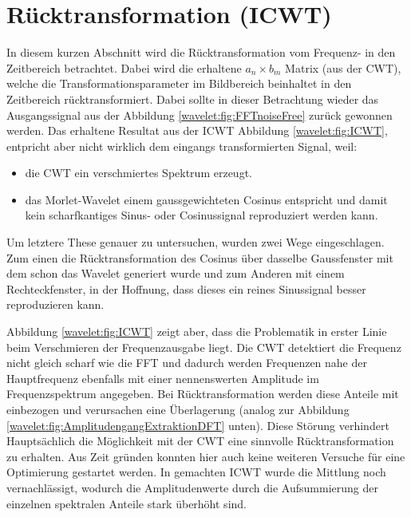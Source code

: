 %
%
%
%
\section{Rücktransformation (ICWT)
	\label{wavelets:section:teil5}}

In diesem kurzen Abschnitt wird die Rücktransformation vom Frequenz- in den Zeitbereich betrachtet. Dabei wird die erhaltene $a_n \times b_m$ Matrix (aus der CWT), welche die Transformationsparameter im Bildbereich beinhaltet in den Zeitbereich rücktransformiert. Dabei sollte in dieser Betrachtung wieder das Ausgangssignal aus der Abbildung \ref{wavelet:fig:FFTnoiseFree} zurück gewonnen werden.
Das erhaltene Resultat aus der ICWT Abbildung \ref{wavelet:fig:ICWT}, entpricht aber nicht wirklich dem eingangs transformierten Signal, weil:

\begin{itemize}
	\item die CWT ein verschmiertes Spektrum erzeugt.
	\item das Morlet-Wavelet einem gaussgewichteten Cosinus entspricht und damit kein scharfkantiges Sinus- oder Cosinussignal reproduziert werden kann.
\end{itemize}

Um letztere These genauer zu untersuchen, wurden zwei Wege eingeschlagen. Zum einen die Rücktransformation des Cosinus über dasselbe Gaussfenster mit dem schon das Wavelet generiert wurde und zum Anderen mit einem Rechteckfenster, in der Hoffnung, dass dieses ein reines Sinussignal besser reproduzieren kann.

Abbildung \ref{wavelet:fig:ICWT} zeigt aber, dass die Problematik in erster Linie beim Verschmieren der Frequenzausgabe liegt. Die CWT detektiert die Frequenz nicht gleich scharf wie die FFT und dadurch werden Frequenzen nahe der Hauptfrequenz ebenfalls mit einer nennenswerten Amplitude im Frequenzspektrum angegeben. Bei Rücktransformation werden diese Anteile mit einbezogen und verursachen eine Überlagerung (analog zur Abbildung \ref{wavelet:fig:AmplitudengangExtraktionDFT} unten). Diese Störung verhindert Hauptsächlich die Möglichkeit mit der CWT eine sinnvolle Rücktransformation zu erhalten. Aus Zeit gründen konnten hier auch keine weiteren Versuche für eine Optimierung gestartet werden. In gemachten ICWT wurde die Mittlung noch vernachlässigt, wodurch die Amplitudenwerte durch die Aufsummierung der einzelnen spektralen Anteile stark überhöht sind.

